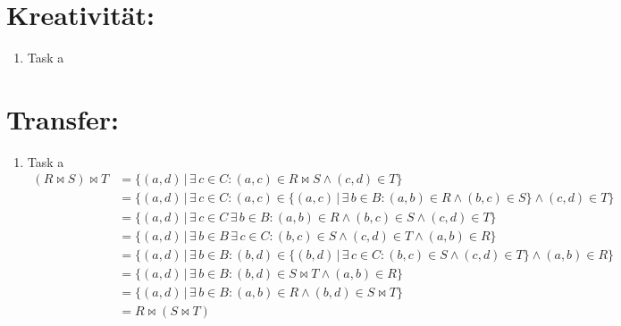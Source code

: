    \section*{Kreativität:}
    \begin{enumerate}[label=(\alph*)]
    	\item Task a
    \end{enumerate}
    \section*{Transfer:}
    \begin{enumerate}[label=(\alph*)]
    	\item Task a
        \begin{align*}
            (R \Join S) \Join T &= \{(a,d) \, | \, \exists\, c \in C : (a,c) \in R \Join S \land (c,d) \in T \}\\
            &=\{(a,d) \, | \, \exists\, c \in C : (a,c) \in \{(a,c) \,|\, \exists\, b \in B : (a,b) \in R \land (b,c) 
            \in S \}  \land (c,d) \in T \}\\
            &=\{(a,d) \, | \, \exists\, c \in C \, \exists\, b \in B : (a,b) \in R \land (b,c) \in S   \land (c,d) \in T \}\\
            &=\{(a,d) \, |  \, \exists\, b \in B \, \exists\, c \in C :  (b,c) \in S   \land (c,d) \in T \land (a,b) 
            \in R  \}\\
            &=\{(a,d) \, |  \, \exists\, b \in B : (b,d) \in \{(b,d) \,|\, \exists\, c \in C :  (b,c) \in S   
            \land (c,d) \in T\} \land (a,b) \in R  \}\\
            &=\{(a,d) \, |  \, \exists\, b \in B : (b,d) \in S\Join T \land (a,b) \in R  \}\\
            &=\{(a,d) \, |  \, \exists\, b \in B : (a,b) \in R \land (b,d) \in S\Join T  \}\\
            &=R \Join (S \Join T)
        \end{align*}
    \end{enumerate}







